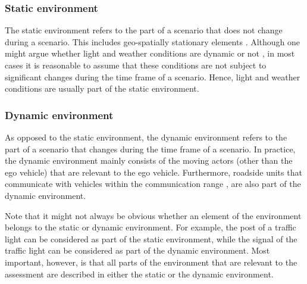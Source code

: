 \subsubsection{Static environment}
\label{sec:static environment}
The static environment refers to the part of a scenario that does not change during a scenario. This includes geo-spatially stationary elements \cite{ulbrich2015}. Although one might argue whether light and weather conditions are dynamic or not \cite{geyer2014,bach2016modelbased}, in most cases it is reasonable to assume that these conditions are not subject to significant changes during the time frame of a scenario. 
Hence, light and weather conditions are usually part of the static environment.

\subsubsection{Dynamic environment}
\label{sec:dynamic environment}
As opposed to the static environment, the dynamic environment refers to the part of a scenario that changes during the time frame of a scenario. 
In practice, the dynamic environment mainly consists of the moving actors (other than the ego vehicle) that are relevant to the ego vehicle. 
Furthermore, roadside units that communicate with vehicles within the communication range \cite{alsultan2014comprehensive}, are also part of the dynamic environment.

Note that it might not always be obvious whether an element of the environment belongs to the static or dynamic environment. For example, the post of a traffic light can be considered as part of the static environment, while the signal of the traffic light can be considered as part of the dynamic environment. Most important, however, is that all parts of the environment that are relevant to the assessment are described in either the static or the dynamic environment.


